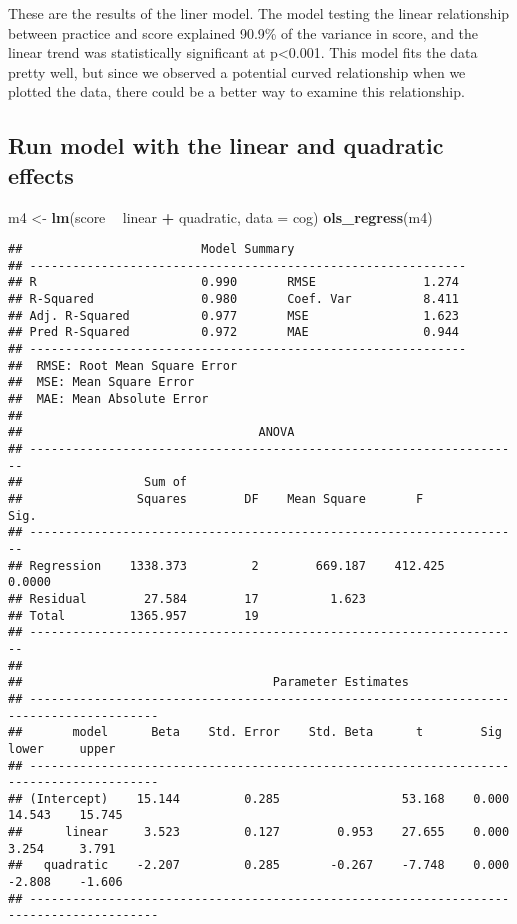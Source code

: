 \documentclass[]{article}
\newenvironment{Shaded}{\begin{snugshade}}{\end{snugshade}}
\newcommand{\KeywordTok}[1]{\textcolor[rgb]{0.13,0.29,0.53}{\textbf{#1}}}
\newcommand{\DataTypeTok}[1]{\textcolor[rgb]{0.13,0.29,0.53}{#1}}
\newcommand{\StringTok}[1]{\textcolor[rgb]{0.31,0.60,0.02}{#1}}
\newcommand{\OperatorTok}[1]{\textcolor[rgb]{0.81,0.36,0.00}{\textbf{#1}}}
\newcommand{\NormalTok}[1]{#1}
\begin{document}
These are the results of the liner model. The model testing the linear
relationship between practice and score explained 90.9\% of the variance
in score, and the linear trend was statistically significant at
p\textless{}0.001. This model fits the data pretty well, but since we
observed a potential curved relationship when we plotted the data, there
could be a better way to examine this relationship.

\subsection{Run model with the linear and quadratic
effects}\label{run-model-with-the-linear-and-quadratic-effects}

\begin{Shaded}
\begin{Highlighting}[]
\NormalTok{m4 <-}\StringTok{ }\KeywordTok{lm}\NormalTok{(score }\OperatorTok{~}\StringTok{ }\NormalTok{linear }\OperatorTok{+}\StringTok{ }\NormalTok{quadratic, }\DataTypeTok{data =}\NormalTok{ cog)}
\KeywordTok{ols_regress}\NormalTok{(m4)}
\end{Highlighting}
\end{Shaded}

\begin{verbatim}
##                         Model Summary                         
## -------------------------------------------------------------
## R                       0.990       RMSE               1.274 
## R-Squared               0.980       Coef. Var          8.411 
## Adj. R-Squared          0.977       MSE                1.623 
## Pred R-Squared          0.972       MAE                0.944 
## -------------------------------------------------------------
##  RMSE: Root Mean Square Error 
##  MSE: Mean Square Error 
##  MAE: Mean Absolute Error 
## 
##                                 ANOVA                                 
## ---------------------------------------------------------------------
##                 Sum of                                               
##                Squares        DF    Mean Square       F         Sig. 
## ---------------------------------------------------------------------
## Regression    1338.373         2        669.187    412.425    0.0000 
## Residual        27.584        17          1.623                      
## Total         1365.957        19                                     
## ---------------------------------------------------------------------
## 
##                                   Parameter Estimates                                    
## ----------------------------------------------------------------------------------------
##       model      Beta    Std. Error    Std. Beta      t        Sig      lower     upper 
## ----------------------------------------------------------------------------------------
## (Intercept)    15.144         0.285                 53.168    0.000    14.543    15.745 
##      linear     3.523         0.127        0.953    27.655    0.000     3.254     3.791 
##   quadratic    -2.207         0.285       -0.267    -7.748    0.000    -2.808    -1.606 
## ----------------------------------------------------------------------------------------
\end{verbatim}
\end{document}
